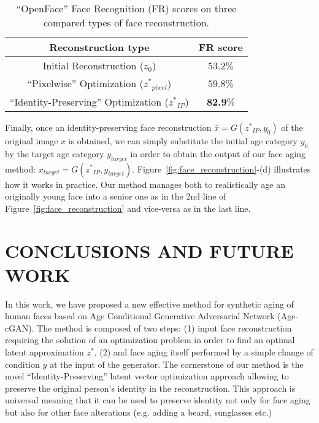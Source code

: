\documentclass{article}
\begin{document}
\begin{table}
	\centering
	\small
		\begin{tabular}{|c|c|}
		\hline
		Reconstruction type & FR score\\
		\hline
		\hline
		Initial Reconstruction (${z_{0}}$) & $53.2$\% \\
		\hline
		\hline
		``Pixelwise'' Optimization (${z^{*}}_{pixel}$) & $59.8$\% \\
		\hline
		``Identity-Preserving'' Optimization (${z^{*}}_{IP}$) & \textbf{82.9}\% \\
		\hline
		\end{tabular}
	\caption{``OpenFace'' Face Recognition (FR) scores on three compared types of face reconstruction.}
	\label{tab:face_reconstruction_scores}
\end{table}

Finally, once an identity-preserving face reconstruction $\bar{x}=G({z^{*}}_{IP},y_{0})$ of the original image $x$ is obtained, we can simply substitute the initial age category $y_{0}$ by the target age category $y_{target}$ in order to obtain the output of our face aging method: $x_{target}=G({z^{*}}_{IP},y_{target})$.
Figure~\ref{fig:face_reconstruction}-(d) illustrates how it works in practice.
Our method manages both to realistically age an originally young face into a senior one as in the 2nd line of Figure~\ref{fig:face_reconstruction} and vice-versa as in the last line.

\section{CONCLUSIONS AND FUTURE WORK}
\label{sec:conclusions_future_works}

In this work, we have proposed a new effective method for synthetic aging of human faces based on Age Conditional Generative Adversarial Network (Age-cGAN).
The method is composed of two steps: (1) input face reconstruction requiring the solution of an optimization problem in order to find an optimal latent approximation $z^{*}$, (2) and face aging itself performed by a simple change of condition $y$ at the input of the generator.
The cornerstone of our method is the novel ``Identity-Preserving'' latent vector optimization approach allowing to preserve the original person's identity in the reconstruction.
This approach is universal meaning that it can be used to preserve identity not only for face aging but also for other face alterations (e.g. adding a beard, sunglasses etc.)
\end{document}

